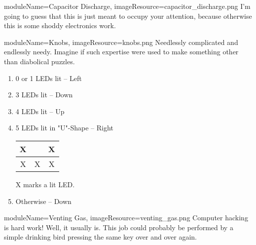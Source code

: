 \documentclass{../../ktane-mod}
\begin{document}
\begin{needymodule}{
  moduleName=Capacitor Discharge,
  imageResource=capacitor_discharge.png
}
{
  I'm going to guess that this is just meant to occupy your attention, because otherwise this is some shoddy electronics work.
}
  \begin{bulletlist}
  \end{bulletlist}

\end{needymodule}

\begin{needymodule}{
  moduleName=Knobs,
  imageResource=knobs.png
}
{
  Needlessly complicated and endlessly needy.
  Imagine if such expertise were used to make something other than diabolical puzzles.
}
  \begin{bulletlist}
  \end{bulletlist}

  \begin{enumerate}[label=\alph{enumi}.]
    \item 0 or 1 LEDs lit -- Left
    \item 3 LEDs lit -- Down
    \item 4 LEDs lit -- Up
    \item 5 LEDs lit in "U"-Shape -- Right\\
    \vspace{0.2cm}
    \begin{tabular}{|c|c|c|}
    \hline
    X & & X \\
    \hline
    X & X & X \\
    \hline
    \end{tabular} \quad X marks a lit LED\@.
    \item Otherwise -- Down
  \end{enumerate}

\end{needymodule}

\begin{needymodule}{
  moduleName=Venting Gas,
  imageResource=venting_gas.png
}
{
  Computer hacking is hard work!
  Well, it usually is.
  This job could probably be performed by a simple drinking bird pressing the same key over and over again.
}
  \begin{bulletlist}
  \end{bulletlist}

\end{needymodule}

\cleardoublepage
\end{document}
